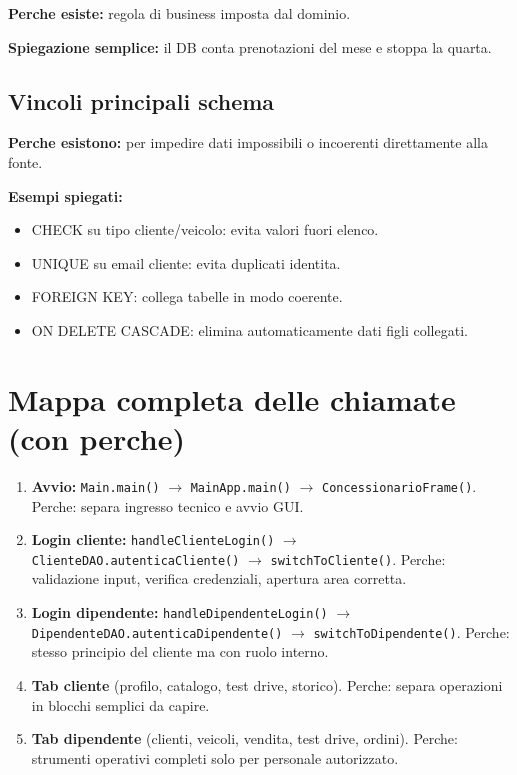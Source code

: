 \documentclass[12pt,a4paper]{article}
\begin{document}
\textbf{Perche esiste:} regola di business imposta dal dominio.

\textbf{Spiegazione semplice:} il DB conta prenotazioni del mese e stoppa la quarta.

\subsection{Vincoli principali schema}
\textbf{Perche esistono:}
per impedire dati impossibili o incoerenti direttamente alla fonte.

\textbf{Esempi spiegati:}
\begin{itemize}
  \item CHECK su tipo cliente/veicolo: evita valori fuori elenco.
  \item UNIQUE su email cliente: evita duplicati identita.
  \item FOREIGN KEY: collega tabelle in modo coerente.
  \item ON DELETE CASCADE: elimina automaticamente dati figli collegati.
\end{itemize}

\section{Mappa completa delle chiamate (con perche)}
\begin{enumerate}
  \item \textbf{Avvio:} \texttt{Main.main()} $\rightarrow$ \texttt{MainApp.main()} $\rightarrow$ \texttt{ConcessionarioFrame()}.
  Perche: separa ingresso tecnico e avvio GUI.

  \item \textbf{Login cliente:} \texttt{handleClienteLogin()} $\rightarrow$ \texttt{ClienteDAO.autenticaCliente()} $\rightarrow$ \texttt{switchToCliente()}.
  Perche: validazione input, verifica credenziali, apertura area corretta.

  \item \textbf{Login dipendente:} \texttt{handleDipendenteLogin()} $\rightarrow$ \texttt{DipendenteDAO.autenticaDipendente()} $\rightarrow$ \texttt{switchToDipendente()}.
  Perche: stesso principio del cliente ma con ruolo interno.

  \item \textbf{Tab cliente} (profilo, catalogo, test drive, storico).
  Perche: separa operazioni in blocchi semplici da capire.

  \item \textbf{Tab dipendente} (clienti, veicoli, vendita, test drive, ordini).
  Perche: strumenti operativi completi solo per personale autorizzato.
\end{enumerate}
\end{document}
